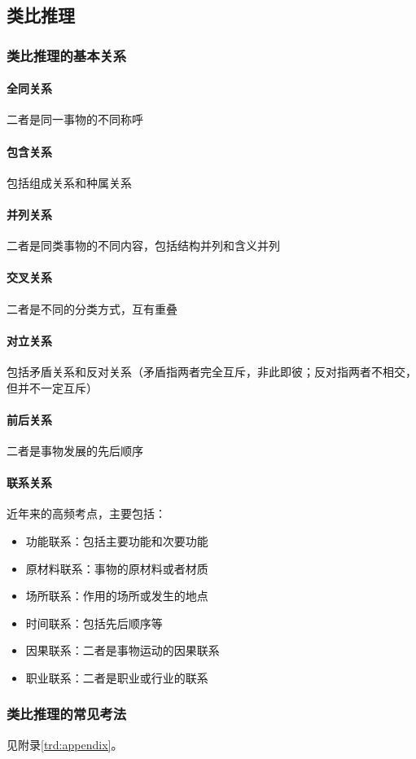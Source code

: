\subsection{类比推理}

\subsubsection{类比推理的基本关系}

\paragraph{全同关系} 二者是同一事物的不同称呼

\paragraph{包含关系} 包括组成关系和种属关系

\paragraph{并列关系} 二者是同类事物的不同内容，包括结构并列和含义并列

\paragraph{交叉关系} 二者是不同的分类方式，互有重叠

\paragraph{对立关系} 包括矛盾关系和反对关系（矛盾指两者完全互斥，非此即彼；反对指两者不相交，但并不一定互斥）

\paragraph{前后关系} 二者是事物发展的先后顺序

\paragraph{联系关系} 近年来的高频考点，主要包括：

\begin{itemize}
    \item 功能联系：包括主要功能和次要功能
    \item 原材料联系：事物的原材料或者材质
    \item 场所联系：作用的场所或发生的地点
    \item 时间联系：包括先后顺序等
    \item 因果联系：二者是事物运动的因果联系
    \item 职业联系：二者是职业或行业的联系
\end{itemize}

\subsubsection{类比推理的常见考法}

见附录\ref{trd:appendix}。



